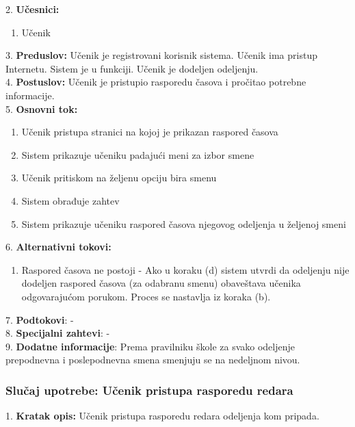 \documentclass{article}
\begin{document}
2. \textbf{Učesnici:}
\begin{enumerate} [label=(\alph*)]
\item Učenik
\end{enumerate} 

3. \textbf{Preduslov:} Učenik je registrovani korisnik sistema. Učenik ima pristup Internetu. Sistem je u funkciji. Učenik je dodeljen odeljenju. \\

4. \textbf{Postuslov:} Učenik je pristupio rasporedu časova i pročitao potrebne informacije. \\

5. \textbf{Osnovni tok:} 
\begin{enumerate} [label=(\alph*)]
\item Učenik pristupa stranici na kojoj je prikazan raspored časova
\item Sistem prikazuje učeniku padajući meni za izbor smene
\item Učenik pritiskom na željenu opciju bira smenu
\item Sistem obrađuje zahtev
\item Sistem prikazuje učeniku raspored časova njegovog odeljenja u željenoj smeni 
\end{enumerate}

6. \textbf{Alternativni tokovi:}
\begin{enumerate} [label=(\roman*)]
\item Raspored časova ne postoji - Ako u koraku (d) sistem utvrdi da odeljenju nije dodeljen raspored časova (za odabranu smenu) obaveštava učenika odgovarajućom porukom. Proces se nastavlja iz koraka (b).

\end{enumerate}

7. \textbf{Podtokovi}: - \\

8. \textbf{Specijalni zahtevi}: - \\

9. \textbf{Dodatne informacije}: Prema pravilniku škole za svako odeljenje prepodnevna i poslepodnevna smena smenjuju se na nedeljnom nivou. \\


\subsubsection{Slučaj upotrebe: Učenik pristupa rasporedu redara} 
1. \textbf{Kratak opis:} Učenik pristupa rasporedu redara odeljenja kom pripada. \\ 
\end{document}
